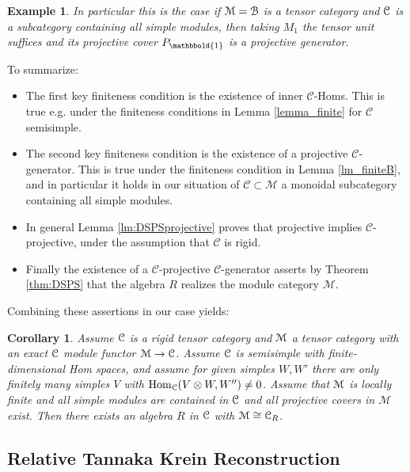 \documentclass[a4paper, reqno]{amsart}
\newtheorem{corollary}[theorem]{Corollary}
\newtheorem{example}[theorem]{Example}
\theoremstyle{introTheorems}
\newcommand\cC{\mathcal{C}}
\newcommand\cM{\mathcal{M}}
\newcommand\Hom{\textup{Hom}}
\renewcommand{\1}{\mathbbold{1}}
\begin{document}
\begin{example}\label{ex_finiteB}
In particular this is the case if $\mathcal{M}=\mathcal{B}$ is a tensor category and $\mathcal{C}$ is a subcategory containing all simple modules, then taking $M_1$ the tensor unit suffices and its projective cover ${P}_\1$ is a projective generator.    
\end{example}

To summarize:
\begin{itemize}
    \item The first key finiteness condition is the existence of inner $\cC$-Homs. This is true e.g. under the finiteness conditions in Lemma \ref{lemma_finite} for $\cC$ semisimple.
    \item The second key finiteness condition is the existence of a projective $\cC$-generator. This is true under the finiteness condition in Lemma \ref{lm_finiteB}, and in particular it holds in our situation of $\cC\subset \cM$ a monoidal subcategory containing all simple modules.   
    \item In general  Lemma \ref{lm:DSPSprojective} proves that projective implies $\cC$-projective, under the assumption that $\cC$ is rigid.
    \item Finally the existence of a $\cC$-projective $\cC$-generator asserts by Theorem \ref{thm:DSPS} that the algebra $R$ realizes the module category $\cM$.
\end{itemize}

Combining these assertions in our case yields:

\begin{corollary}\label{cor:ModuleCatFiniteFinal}
    Assume $\mathcal{C}$ is a rigid tensor category and $\mathcal{M}$ a tensor category with an exact $\mathcal{C}$ module functor $\mathcal{M}\to \mathcal{C}$. Assume $\mathcal{C}$ is semisimple with finite-dimensional Hom spaces, and assume for given simples $W,W'$ there are only finitely many simples $V$ with $\Hom_\catC(V\otimes W,W'')\neq 0$. Assume that $\mathcal{M}$ is locally finite and all simple modules are contained in $\mathcal{C}$ and all projective covers in $\cM$ exist. Then there exists an algebra $R$ in $\mathcal{C}$ with $\mathcal{M}\cong\mathcal{C}_R$.
\end{corollary}


\subsection{Relative Tannaka Krein Reconstruction}\label{subsec:Mombelli}

\newcommand{\Hdual}{C}
\end{document}
